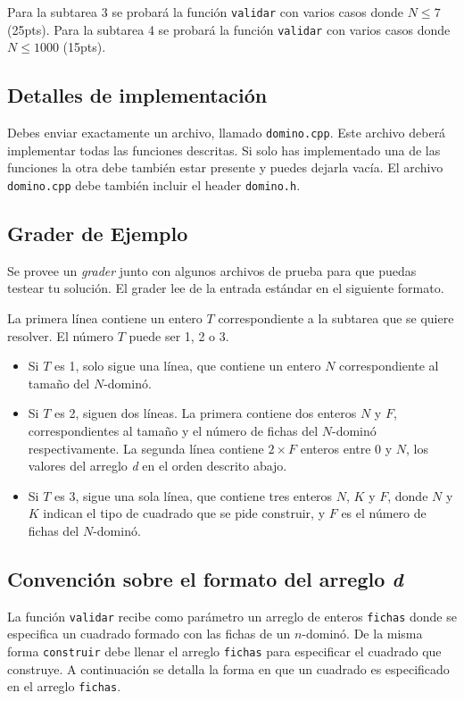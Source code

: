 \documentclass{oci}
\begin{document}
Para la subtarea 3 se probará la función \verb+validar+ con varios casos donde $N\leq 7$ (25pts).
Para la subtarea 4 se probará la función \verb+validar+ con varios casos donde $N\leq 1000$ (15pts).

\subsection*{Detalles de implementación}
Debes enviar exactamente un archivo, llamado \verb+domino.cpp+.
Este archivo deberá implementar todas las funciones descritas.
Si solo has implementado una de las funciones la otra debe también estar presente y puedes dejarla vacía.
El archivo \verb+domino.cpp+ debe también incluir el header \verb+domino.h+.

\subsection*{Grader de Ejemplo}
Se provee un \emph{grader} junto con algunos archivos de prueba para que puedas testear tu solución.
El grader lee de la entrada estándar en el siguiente formato.

La primera línea contiene un entero $T$ correspondiente a la subtarea que se quiere resolver.
El número $T$ puede ser 1, 2 o 3.
\begin{itemize}
 \item Si $T$ es 1, solo sigue una línea, que contiene un entero $N$ correspondiente al tamaño del $N$-dominó.
 \item Si $T$ es 2, siguen dos líneas.
La primera contiene dos enteros $N$ y $F$, correspondientes al tamaño y el número de fichas del $N$-dominó respectivamente.
La segunda línea contiene $2\times F$ enteros entre 0 y $N$, los valores del arreglo \emph{d} en el orden descrito abajo.
 \item Si $T$ es 3, sigue una sola línea, que contiene tres enteros $N$, $K$ y $F$, donde $N$ y $K$ indican el tipo de cuadrado que se pide construir, y $F$ es el número de fichas del $N$-dominó.
\end{itemize}

\subsection*{Convención sobre el formato del arreglo \emph{d}}
La función \verb+validar+ recibe como parámetro un arreglo de enteros \verb+fichas+ donde se especifica un cuadrado formado con las fichas de un $n$-dominó.
De la misma forma \verb+construir+ debe llenar el arreglo \verb+fichas+ para especificar el cuadrado que construye.
A continuación se detalla la forma en que un cuadrado es especificado en el arreglo \verb+fichas+.
\end{document}
